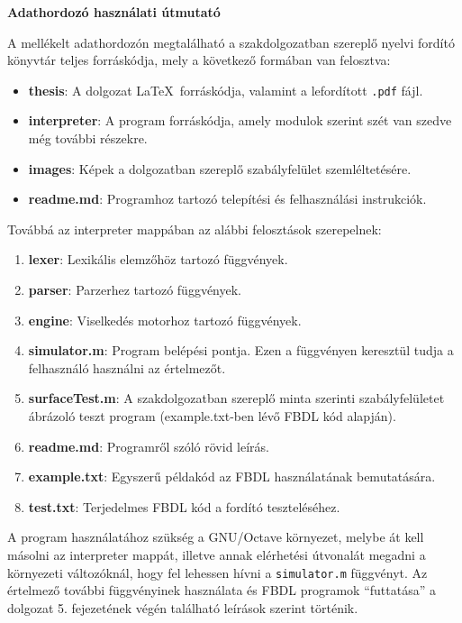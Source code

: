 \pagestyle{empty}

\noindent \textbf{\Large Adathordozó használati útmutató}

\vskip 1cm

A mellékelt adathordozón megtalálható a szakdolgozatban szereplő nyelvi fordító könyvtár teljes forráskódja, mely a következő formában van felosztva:

\begin{itemize}
	\item \textbf{thesis}: A dolgozat \LaTeX\ forráskódja, valamint a lefordított \texttt{.pdf} fájl.
	\item \textbf{interpreter}: A program forráskódja, amely modulok szerint szét van szedve még további részekre.
	\item \textbf{images}: Képek a dolgozatban szereplő szabályfelület szemléltetésére.
	\item \textbf{readme.md}: Programhoz tartozó telepítési és felhasználási instrukciók.
\end{itemize}

\noindent Továbbá az interpreter mappában az alábbi felosztások szerepelnek:
\begin{enumerate}
	\item \textbf{lexer}: Lexikális elemzőhöz tartozó függvények.
	\item \textbf{parser}: Parzerhez tartozó függvények.
	\item \textbf{engine}: Viselkedés motorhoz tartozó függvények.
	\item \textbf{simulator.m}: Program belépési pontja. Ezen a függvényen keresztül tudja a felhasználó használni az értelmezőt.
	\item \textbf{surfaceTest.m}: A szakdolgozatban szereplő minta szerinti szabályfelületet ábrázoló teszt program (example.txt-ben lévő FBDL kód alapján).
	\item \textbf{readme.md}: Programről szóló rövid leírás.
	\item \textbf{example.txt}: Egyszerű példakód az FBDL használatának bemutatására.
	\item \textbf{test.txt}: Terjedelmes FBDL kód a fordító teszteléséhez.
\end{enumerate}

A program használatához szükség a GNU/Octave környezet, melybe át kell másolni az interpreter mappát, illetve annak elérhetési útvonalát megadni a környezeti változóknál, hogy fel lehessen hívni a \texttt{simulator.m} függvényt. Az értelmező további függvényinek használata és FBDL programok ``futtatása'' a dolgozat 5. fejezetének végén található leírások szerint történik.